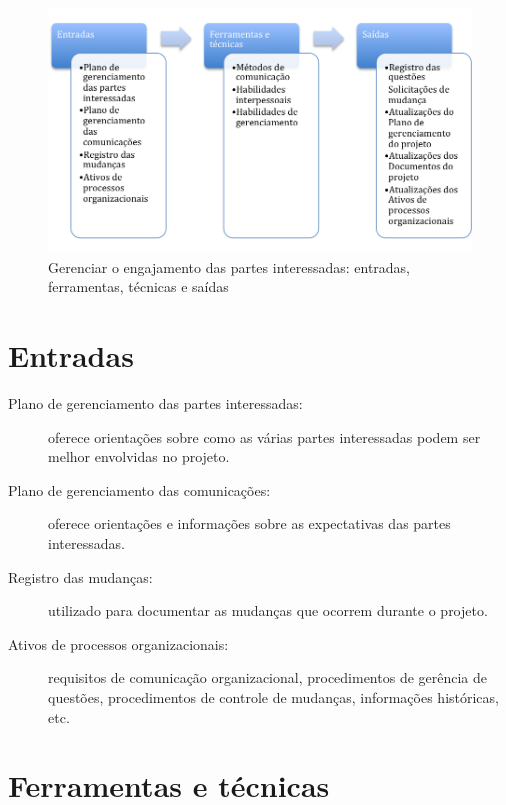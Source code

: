 \begin{figure}[!h]
	\centering
	\includegraphics[scale=0.5]{Figuras/stakeholders_efts_ger_engaja.png}
	\caption{Gerenciar o engajamento das partes interessadas: entradas, ferramentas, técnicas e saídas}
	\label{fig:sh:engaja:ger:efts}
\end{figure}

\section{Entradas}

\begin{description}

	\item[Plano de gerenciamento das partes interessadas:] oferece orientações sobre como as várias partes interessadas podem ser melhor envolvidas no projeto.
	
	\item[Plano de gerenciamento das comunicações:] oferece orientações e informações sobre as expectativas das partes interessadas.
	
	\item[Registro das mudanças:] utilizado para documentar as mudanças que ocorrem durante o projeto.
	
	\item[Ativos de processos organizacionais:] requisitos de comunicação organizacional, procedimentos de gerência de questões, procedimentos de controle de mudanças, informações históricas, etc.
	

\end{description}

\section{Ferramentas e técnicas}

